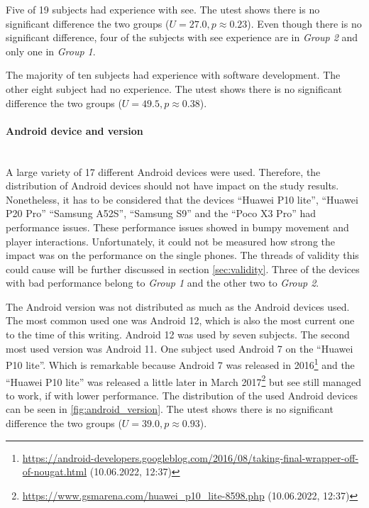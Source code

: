 Five of 19 subjects had experience with \gls{see}.
The \gls{utest} shows there is no significant difference the two groups ($U = 27.0, p \approx 0.23$).
Even though there is no significant difference, four of the subjects with \gls{see} experience are in \textit{Group 2} and only one in \textit{Group 1}.

The majority of ten subjects had experience with software development.
The other eight subject had no experience.
The \gls{utest} shows there is no significant difference the two groups ($U = 49.5, p \approx 0.38$).

\paragraph{Android device and version}\mbox{}\\
A large variety of 17 different Android devices were used.
Therefore, the distribution of Android devices should not have impact on the study results.
Nonetheless, it has to be considered that the devices \enquote{Huawei P10 lite}, \enquote{Huawei P20 Pro} \enquote{Samsung A52S}, \enquote{Samsung S9} and the \enquote{Poco X3 Pro} had performance issues.
These performance issues showed in bumpy movement and player interactions.
Unfortunately, it could not be measured how strong the impact was on the performance on the single phones.
The threads of validity this could cause will be further discussed in section \ref{sec:validity}.
Three of the devices with bad performance belong to \textit{Group 1} and the other two to \textit{Group 2}.

The Android version was not distributed as much as the Android devices used. 
The most common used one was Android 12, which is also the most current one to the time of this writing.
Android 12 was used by seven subjects.
The second most used version was Android 11.
One subject used Android 7 on the \enquote{Huawei P10 lite}.
Which is remarkable because Android 7 was released in 2016\footnote{\url{https://android-developers.googleblog.com/2016/08/taking-final-wrapper-off-of-nougat.html} (10.06.2022, 12:37)} and the \enquote{Huawei P10 lite} was released a little later in March 2017\footnote{\url{https://www.gsmarena.com/huawei_p10_lite-8598.php} (10.06.2022, 12:37)} but \gls{see} still managed to work, if with lower performance.
The distribution of the used Android devices can be seen in \ref{fig:android_version}.
The \gls{utest} shows there is no significant difference the two groups ($U = 39.0, p \approx 0.93$).

